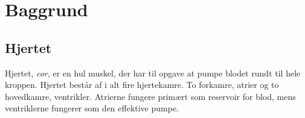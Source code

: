 \chapter{Baggrund}

\section{Hjertet}
Hjertet, \textit{cor}, er en hul muskel, der har til opgave at pumpe blodet rundt til hele kroppen. Hjertet består af i alt fire hjertekamre. To forkamre, atrier og to hovedkamre, ventrikler. Atrierne fungere primært som reservoir for blod, mens ventriklerne fungerer som den effektive pumpe.


  
